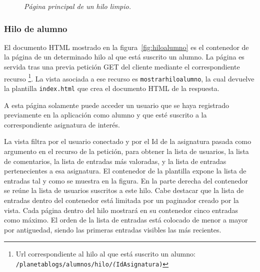 \documentclass[a4paper, 12pt]{book}
\begin{document}
\begin{figure}
  \centering
  \caption{\textit{P\'agina principal de un hilo limpio.}}
  \label{fig:hilos}
\end{figure}


\subsubsection{Hilo de alumno} 
\label{sec:hiloalumno}
El documento HTML mostrado en la figura~\ref{fig:hiloalumno} es el contenedor de la p\'agina de un determinado hilo al que est\'a suscrito un alumno. 
La p\'agina es servida tras una previa petici\'on GET del cliente mediante el correspondiente recurso \footnote{Url correspondiente al hilo al que est\'a
suscrito un alumno: \texttt{/planetablogs/alumnos/hilo/\textit(IdAsignatura)}}. La vista asociada a ese recurso es \texttt{mostrarhiloalumno}, la cual 
devuelve la plantilla \texttt{index.html} que crea el documento HTML de la respuesta.

A esta p\'agina solamente puede acceder un usuario que se haya registrado previamente en la aplicaci\'on como alumno y que est\'e suscrito a la
correspondiente asignatura de inter\'es.

La vista filtra por el usuario conectado y por el Id de la asignatura pasada como argumento en el recurso de la petici\'on, para obtener la lista de 
usuarios, la lista de comentarios, la lista de entradas m\'as valoradas, y la lista de entradas pertenecientes a esa asignatura. 
El contenedor de la plantilla expone la lista de entradas tal y como se muestra en la figura. En la parte derecha del contenedor se re\'une la lista de 
usuarios suscritos a este hilo. Cabe destacar que la lista de entradas dentro del contenedor est\'a limitada por un paginador creado por la vista. Cada 
p\'agina dentro del hilo mostrar\'a en su contenedor cinco entradas como m\'aximo. El orden de la lista de entradas est\'a colocado de menor a mayor por 
antiguedad, siendo las primeras entradas visibles las m\'as recientes.
\end{document}
